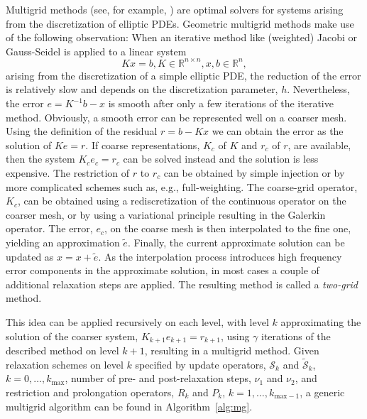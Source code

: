 Multigrid methods (see, for
example, \cite{WLBriggs_VEHenson_SFMcCormick_2000a, UTrottenberg_etal_2001a}) are optimal solvers for systems arising from the
discretization of elliptic PDEs. Geometric multigrid methods make use
of the following observation: When an iterative method like (weighted)
Jacobi or Gauss-Seidel is applied to a linear system
\[
  K x = b, K \in \mathbb{R}^{n \times n}, x, b \in \mathbb{R}^n,
\]
arising from the discretization of a simple elliptic PDE, the
reduction of the error is relatively slow and depends on the
discretization parameter, $h$. Nevertheless, the error $e = K^{-1} b -
x$ is smooth after only a few iterations of the iterative
method. Obviously, a smooth error can be represented well on a coarser
mesh. Using the definition of the residual $r = b - K x$ we can obtain
the error as the solution of $K e = r$. If coarse representations,
$K_c$ of $K$ and $r_c$ of $r$, are available, then the system $K_c e_c = r_c$
can be solved instead and the solution is less expensive. The
restriction of $r$ to $r_c$ can be obtained by simple injection or by
more complicated schemes such as, e.g., full-weighting. The coarse-grid
operator, $K_c$, can be obtained using a rediscretization of the
continuous operator on the coarser mesh, or by using a variational
principle resulting in the Galerkin operator. The error, $e_c$, on the
coarse mesh is then interpolated to the fine one, yielding an
approximation $\tilde{e}$. Finally, the current approximate solution
can be updated as $x = x + \tilde{e}$. As the interpolation process
introduces high frequency error components in the approximate
solution, in most cases a couple of additional relaxation steps are
applied. The resulting method is called a
\emph{two-grid} method.

This idea can be applied recursively on each level, with level
$k$ approximating the solution of the coarser system, $K_{k+1} e_{k+1} = r_{k+1}$,
using $\gamma$ iterations of the described method on
level $k+1$, resulting in a multigrid method. Given relaxation
schemes on level $k$ specified by update operators,
$\mathcal{S}_k$ and $\tilde{\mathcal{S}}_k$,
$k = 0,\dots,k_\text{max}$, number of pre- and post-relaxation steps, $\nu_1$ and $\nu_2$, and restriction and prolongation operators,
$R_k$ and $P_k$, $k = 1,\dots,k_{\text{max}-1}$, a generic
multigrid algorithm can be found in Algorithm~\ref{alg:mg}.

